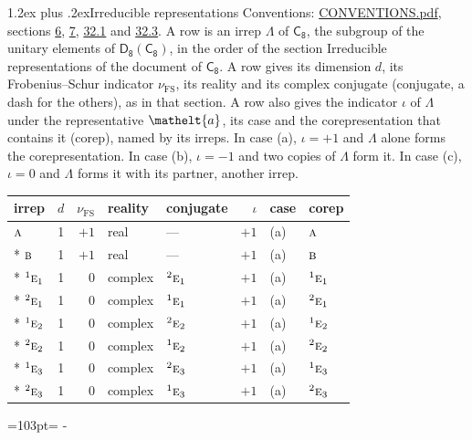 \documentclass[10pt,a4paper]{article}
\makeatletter
\renewcommand\section{\@startsection{section}{1}{\z@}{-3ex plus -1ex minus -.2ex}%
  {1.2ex plus .2ex}{\normalfont\large\sffamily\bfseries\color{parttitle}}}
\newcommand{\needspace}[1]{\par\penalty-100\begingroup\dimen0=#1\relax\dimen2=\pagegoal
  \advance\dimen2-\pagetotal\ifdim\dimen0>\dimen2\relax\ifdim\dimen2>0pt\vfil\break\fi\fi
  \endgroup}
\numberwithin{equation}{section}
\newcommand{\eltfont}[1]{{\let\sigma\eltsigma\mathelt{#1}}}
\newcommand{\grp}[1]{\mathsf{#1}}
\newcommand{\irr}[1]{\text{\normalfont\scshape #1}}
\newcommand{\conjpair}[1]{{}^{#1}}
\newcommand{\elt}[1]{\eltfont{#1}}
\newcommand{\fsind}{\nu_{\mathrm{FS}}}
\makeatother
\begin{document}
\section{Irreducible representations}\label{s:irreps}
Conventions: \href{../../CONVENTIONS.pdf}{CONVENTIONS.pdf}, sections \href{../../../rotation/CONVENTIONS.pdf\#conv.6}{6}, \href{../../../rotation/CONVENTIONS.pdf\#conv.7}{7}, \href{../../CONVENTIONS.pdf\#conv.32.1}{32.1} and \href{../../CONVENTIONS.pdf\#conv.32.3}{32.3}.
\leavevmode\label{n:irrep.Delta}A row is an irrep $\Lambda$ of $\grp{C_{8}}$, the subgroup of the unitary elements of $\grp{D_{8}}(\grp{C_{8}})$, in the order of the section Irreducible representations of the document of \href{../../../rotation/data/pdf/C8.pdf}{$\grp{C_{8}}$}. \label{n:index.dimension}\label{n:index.frobenius}\label{n:head.irrep}\label{n:head.reality}\label{n:head.conjugate}A row gives its dimension $d$, its Frobenius--Schur indicator $\fsind$, its reality and its complex conjugate (conjugate, a dash for the others), as in that section. \label{n:head.case.corep}\label{n:head.corep}A row also gives the indicator $\iota$ of $\Lambda$ under the representative $\elt{a}$, its case and the corepresentation that contains it (corep), named by its irreps. In case (a), $\iota = +1$ and $\Lambda$ alone forms the corepresentation. In case (b), $\iota = -1$ and two copies of $\Lambda$ form it. In case (c), $\iota = 0$ and $\Lambda$ forms it with its partner, another irrep.
\setlength{\emergencystretch}{2em}\par\setlength{\emergencystretch}{0pt}
{\small\renewcommand{\arraystretch}{1.25}\setlength{\tabcolsep}{4pt}\begin{longtable}{@{}lrrllrll@{}}\toprule
irrep & $d$ & $\fsind$ & reality & conjugate & $\iota$ & case & corep\\\midrule\endhead
\bottomrule\endfoot\endlastfoot
$\irr{a}$ & 1 & $+1$ & real & --- & $+1$ & (a) & $\irr{a}$\\*
$\irr{b}$ & 1 & $+1$ & real & --- & $+1$ & (a) & $\irr{b}$\\*
$\conjpair{1}\irr{e}_{1}$ & 1 & $0$ & complex & $\conjpair{2}\irr{e}_{1}$ & $+1$ & (a) & $\conjpair{1}\irr{e}_{1}$\\*
$\conjpair{2}\irr{e}_{1}$ & 1 & $0$ & complex & $\conjpair{1}\irr{e}_{1}$ & $+1$ & (a) & $\conjpair{2}\irr{e}_{1}$\\*
$\conjpair{1}\irr{e}_{2}$ & 1 & $0$ & complex & $\conjpair{2}\irr{e}_{2}$ & $+1$ & (a) & $\conjpair{1}\irr{e}_{2}$\\*
$\conjpair{2}\irr{e}_{2}$ & 1 & $0$ & complex & $\conjpair{1}\irr{e}_{2}$ & $+1$ & (a) & $\conjpair{2}\irr{e}_{2}$\\*
$\conjpair{1}\irr{e}_{3}$ & 1 & $0$ & complex & $\conjpair{2}\irr{e}_{3}$ & $+1$ & (a) & $\conjpair{1}\irr{e}_{3}$\\*
$\conjpair{2}\irr{e}_{3}$ & 1 & $0$ & complex & $\conjpair{1}\irr{e}_{3}$ & $+1$ & (a) & $\conjpair{2}\irr{e}_{3}$\\
\bottomrule\end{longtable}}
\needspace{103pt}
\end{document}
